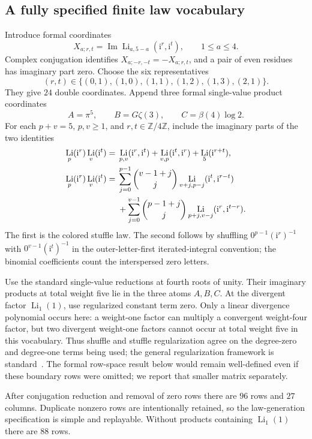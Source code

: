 \documentclass[11pt]{article}
\numberwithin{equation}{section}
\theoremstyle{definition}
\theoremstyle{remark}
\DeclareMathOperator{\Li}{Li}
\DeclareMathOperator{\Imm}{Im}
\newcommand{\Z}{\mathbb Z}
\newcommand{\ii}{\mathrm i}
\begin{document}
\subsection{A fully specified finite law vocabulary}
Introduce formal coordinates
\[
 X_{a;r,t}=\Imm\Li_{a,5-a}(\ii^r,\ii^t),\qquad 1\le a\le4.
\]
Complex conjugation identifies $X_{a;-r,-t}=-X_{a;r,t}$, and a pair
of even residues has imaginary part zero. Choose the six representatives
\begin{equation}\label{eq:S4-pairs}
 (r,t)\in\{(0,1),(1,0),(1,1),(1,2),(1,3),(2,1)\}.
\end{equation}
They give $24$ double coordinates. Append three formal single-value
product coordinates
\[
 A=\pi^5,\qquad B=G\zeta(3),\qquad C=\beta(4)\log2.
\]
For each $p+v=5$, $p,v\ge1$, and $r,t\in\Z/4\Z$, include the
imaginary parts of the two identities
\begin{align}
 \Li_p(\ii^r)\Li_v(\ii^t)
 ={}&\Li_{p,v}(\ii^r,\ii^t)+\Li_{v,p}(\ii^t,\ii^r)
 +\Li_5(\ii^{r+t}),\label{eq:S4-stuffle}\\
 \Li_p(\ii^r)\Li_v(\ii^t)
 ={}&\sum_{j=0}^{p-1}\binom{v-1+j}{j}
 \Li_{v+j,p-j}(\ii^t,\ii^{r-t})\notag\\
 &+\sum_{j=0}^{v-1}\binom{p-1+j}{j}
 \Li_{p+j,v-j}(\ii^r,\ii^{t-r}).\label{eq:S4-shuffle}
\end{align}
The first is the colored stuffle law. The second follows by shuffling
$0^{p-1}(\ii^r)^{-1}$ with $0^{v-1}(\ii^t)^{-1}$ in the
outer-letter-first iterated-integral convention; the binomial
coefficients count the interspersed zero letters.

Use the standard single-value reductions at fourth roots of unity.
Their imaginary products at total weight five lie in the three atoms
$A,B,C$. At the divergent factor $\Li_1(1)$, use regularized constant
term zero. Only a linear divergence polynomial occurs here: a weight-one
factor can multiply a convergent weight-four factor, but two divergent
weight-one factors cannot occur at total weight five in this vocabulary.
Thus shuffle and stuffle regularization agree on the degree-zero and
degree-one terms being used; the general regularization framework is
standard~\cite{racinet}. The formal row-space result below would remain
well-defined even if these boundary rows were omitted; we report that
smaller matrix separately.

After conjugation reduction and removal of zero rows there are $96$
rows and $27$ columns. Duplicate nonzero rows are intentionally retained,
so the law-generation specification is simple and replayable. Without
products containing $\Li_1(1)$ there are $88$ rows.
\end{document}

